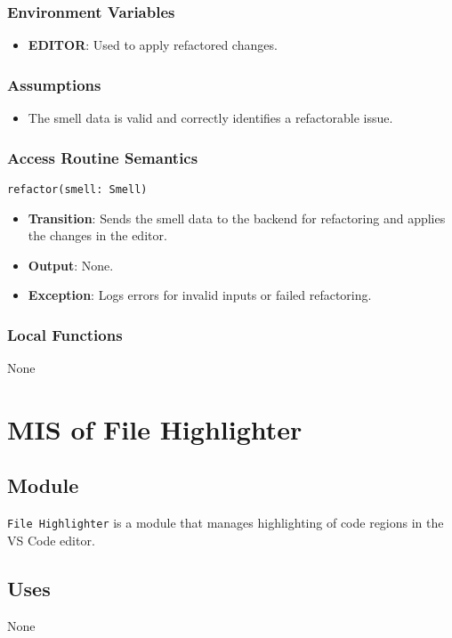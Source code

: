 \documentclass[12pt, titlepage]{article}
\begin{document}
\subsubsection{Environment Variables}
\begin{itemize}
\item \textbf{EDITOR}: Used to apply refactored changes.
\end{itemize}

\subsubsection{Assumptions}
\begin{itemize}
\item The smell data is valid and correctly identifies a refactorable issue.
\end{itemize}

\subsubsection{Access Routine Semantics}
\texttt{refactor(smell: Smell)}
\begin{itemize}
\item \textbf{Transition}: Sends the smell data to the backend for refactoring and applies the changes in the editor.
\item \textbf{Output}: None.
\item \textbf{Exception}: Logs errors for invalid inputs or failed refactoring.
\end{itemize}

\subsubsection{Local Functions}
None

\section{MIS of File Highlighter}

\subsection{Module}
\texttt{File Highlighter} is a module that manages highlighting of code regions in the VS Code editor.

\subsection{Uses}
None
\end{document}

